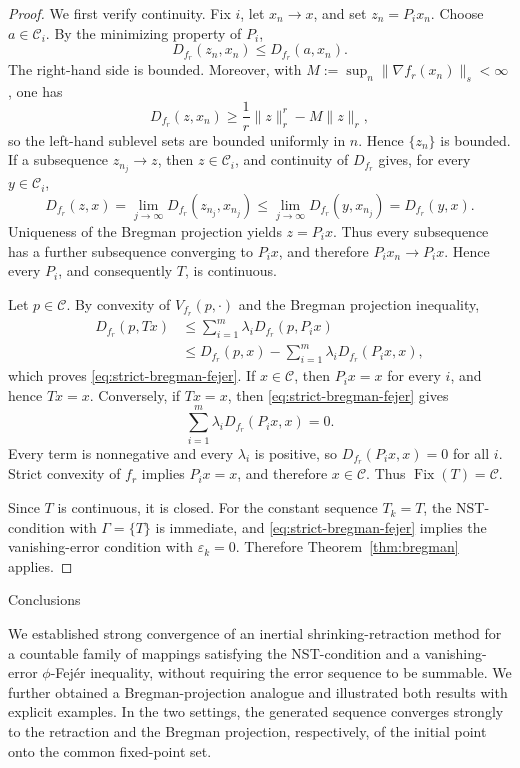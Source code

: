 \documentclass[leqno,12pt]{amsart}
\makeatletter
\theoremstyle{definition}
\theoremstyle{remark}
\numberwithin{equation}{section}
\newcommand{\C}{\mathscr{C}}
\newcommand{\Fix}{\operatorname{Fix}}
\def\section{\@startsection{section}{1}%
  \z@{.7\linespacing\@plus\linespacing}{.5\linespacing}%
  {\normalfont\bfseries\centering}}
\makeatother
\begin{document}
\begin{proof}
We first verify continuity. Fix $i$, let $x_n\to x$, and set
$z_n=P_i x_n$. Choose $a\in\C_i$. By the minimizing property of $P_i$,
\[
 D_{f_r}(z_n,x_n)\leq D_{f_r}(a,x_n).
\]
The right-hand side is bounded. Moreover, with
$M:=\sup_n\|\nabla f_r(x_n)\|_s<\infty$, one has
\[
 D_{f_r}(z,x_n)
 \geq \frac1r\|z\|_r^r-M\|z\|_r,
\]
so the left-hand sublevel sets are bounded uniformly in $n$. Hence
$\{z_n\}$ is bounded. If a subsequence $z_{n_j}\to z$, then
$z\in\C_i$, and continuity of $D_{f_r}$ gives, for every $y\in\C_i$,
\[
 D_{f_r}(z,x)
 =\lim_{j\to\infty}D_{f_r}(z_{n_j},x_{n_j})
 \leq\lim_{j\to\infty}D_{f_r}(y,x_{n_j})
 =D_{f_r}(y,x).
\]
Uniqueness of the Bregman projection yields $z=P_i x$. Thus every
subsequence has a further subsequence converging to $P_i x$, and therefore
$P_i x_n\to P_i x$. Hence every $P_i$, and consequently $T$, is continuous.

Let $p\in\C$. By convexity of $V_{f_r}(p,\cdot)$ and the Bregman
projection inequality,
\begin{align*}
 D_{f_r}(p,Tx)
 &\leq\sum_{i=1}^m\lambda_iD_{f_r}(p,P_i x)\\
 &\leq D_{f_r}(p,x)
 -\sum_{i=1}^m\lambda_iD_{f_r}(P_i x,x),
\end{align*}
which proves \eqref{eq:strict-bregman-fejer}. If $x\in\C$, then
$P_i x=x$ for every $i$, and hence $Tx=x$. Conversely, if $Tx=x$, then
\eqref{eq:strict-bregman-fejer} gives
\[
 \sum_{i=1}^m\lambda_iD_{f_r}(P_i x,x)=0.
\]
Every term is nonnegative and every $\lambda_i$ is positive, so
$D_{f_r}(P_i x,x)=0$ for all $i$. Strict convexity of $f_r$ implies
$P_i x=x$, and therefore $x\in\C$. Thus $\Fix(T)=\C$.

Since $T$ is continuous, it is closed. For the constant sequence $T_k=T$,
the NST-condition with $\Gamma=\{T\}$ is immediate, and
\eqref{eq:strict-bregman-fejer} implies the vanishing-error condition with
$\varepsilon_k=0$. Therefore Theorem~\ref{thm:bregman} applies.
\end{proof}


\section{Conclusions}

We established strong convergence of an inertial shrinking-retraction method for a countable family of mappings satisfying the NST-condition and a vanishing-error $\phi$-Fej\'er inequality, without requiring the error sequence to be summable. We further obtained a Bregman-projection analogue and illustrated both results with explicit examples. In the two settings, the generated sequence converges strongly to the retraction and the Bregman projection, respectively, of the initial point onto the common fixed-point set.
\end{document}
